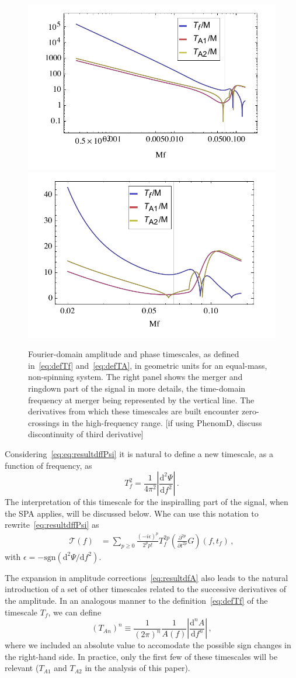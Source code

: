 \documentclass[aps,showpacs,%
prd,superscriptaddress,nofootinbib]{revtex4}
\newcommand{\be}{\begin{equation}}
\newcommand{\ee}{\end{equation}}
\newcommand\ud{{\mathrm{d}}}
\newcommand\calT{{\mathcal{T}}}
\newcommand{\tf}{t_{f}}
\newcommand{\Tf}{T_{f}}
\begin{document}
\begin{figure}
  \centering
  \includegraphics[width=.48\linewidth]{plots/TfTA.pdf}
  \hspace{0.2cm}
  \includegraphics[width=.48\linewidth]{plots/TfTAzoom.pdf}
  \caption{Fourier-domain amplitude and phase timescales, as defined in~\eqref{eq:defTf} and~\eqref{eq:defTA}, in geometric units for an equal-mass, non-spinning system. The right panel shows the merger and ringdown part of the signal in more details, the time-domain frequency at merger being represented by the vertical line. The derivatives from which these timescales are built encounter zero-crossings in the high-frequency range. [if using PhenomD, discuss discontinuity of third derivative]}
  \label{fig:TfTA}
\end{figure}

Considering~\eqref{eq:eq:resultdffPsi} it is natural to define a new timescale, as a function of frequency, as
\be\label{eq:defTf}
	\Tf^{2} = \frac{1}{4\pi^{2}}\left| \frac{\ud^{2}\Psi}{\ud f^{2}} \right| \,.
\ee
The interpretation of this timescale for the inspiralling part of the signal, when the SPA applies, will be discussed below. Whe can use this notation to rewrite~\eqref{eq:resultdffPsi} as
\begin{align}\label{eq:resultdffPsiTf}
	 \calT(f) &= \sum\limits_{p\geq 0} \frac{(-i\epsilon)^{p}}{2^{p}p!} \Tf^{2p} \left( \frac{\partial^{2p} }{\partial t^{2p}} G \right)(f, \tf) \,,
\end{align}
with $\epsilon = -\mathrm{sgn}(\ud^{2}\Psi/\ud f^{2} )$.

The expansion in amplitude corrections~\eqref{eq:resultdfA} also leads to the natural introduction of a set of other timescales related to the successive derivatives of the amplitude. In an analogous manner to the definition~\eqref{eq:defTf} of the timescale $T_{f}$, we can define
\be\label{eq:defTA}
	\left( T_{An} \right)^{n} \equiv \frac{1}{(2 \pi)^{n}} \frac{1}{A(f)} \left| \frac{\ud^{n} A}{\ud f^{n}} \right| \,,
\ee
where we included an absolute value to accomodate the possible sign changes in the right-hand side. In practice, only the first few of these timescales will be relevant ($T_{A1}$ and $T_{A2}$ in the analysis of this paper).
\end{document}

